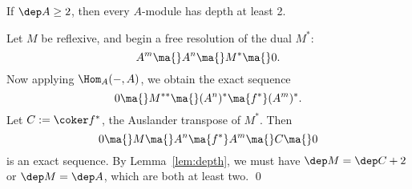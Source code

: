 %
%
%




\begin{cor}
If $\dep A \geq 2$, then every $A$-module has depth at least 2.
\end{cor}

\pf Let $M$ be reflexive, and begin a free resolution of the dual $M^*$:
	\[
	A^m \ma{} A^n \ma{} M^* \ma{} 0.
	\]
Now applying $\Hom_A(-,A)$, we obtain the exact sequence
	\[
	0 \ma{} M^{**} \ma{} (A^n)^* \ma{f^*} (A^m)^*.
	\]
Let $C:= \coker f^*$, the Auslander transpose of $M^*$. Then
	\[
	0 \ma{} M \ma{} A^n \ma{f^*} A^m \ma{} C \ma{} 0
	\]
is an exact sequence. By Lemma~\ref{lem:depth}, we must have $\dep M= \dep C+2$ or $\dep M=\dep A$, which are both at least two. \qed \\


